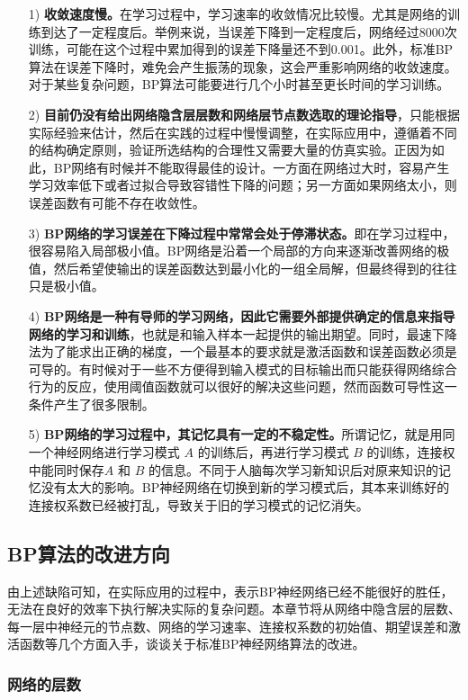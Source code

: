 \documentclass[UTF8]{ctexart}
\begin{document}
\begin{itemize}
\item [1)]
\textbf{收敛速度慢。}在学习过程中，学习速率的收敛情况比较慢。尤其是网络的训练到达了一定程度后。举例来说，当误差下降到一定程度后，网络经过8000次训练，可能在这个过程中累加得到的误差下降量还不到0.001。此外，标准BP算法在误差下降时，难免会产生振荡的现象，这会严重影响网络的收敛速度。对于某些复杂问题，BP算法可能要进行几个小时甚至更长时间的学习训练。
\item [2)]
\textbf{目前仍没有给出网络隐含层层数和网络层节点数选取的理论指导}，只能根据实际经验来估计，然后在实践的过程中慢慢调整，在实际应用中，遵循着不同的结构确定原则，验证所选结构的合理性又需要大量的仿真实验。正因为如此，BP网络有时候并不能取得最佳的设计。一方面在网络过大时，容易产生学习效率低下或者过拟合导致容错性下降的问题；另一方面如果网络太小，则误差函数有可能不存在收敛性。
\item [3)]
\textbf{BP网络的学习误差在下降过程中常常会处于停滞状态。}即在学习过程中，很容易陷入局部极小值。BP网络是沿着一个局部的方向来逐渐改善网络的极值，然后希望使输出的误差函数达到最小化的一组全局解，但最终得到的往往只是极小值。
\item [4)]
\textbf{BP网络是一种有导师的学习网络，因此它需要外部提供确定的信息来指导网络的学习和训练}，也就是和输入样本一起提供的输出期望。同时，最速下降法为了能求出正确的梯度，一个最基本的要求就是激活函数和误差函数必须是可导的。有时候对于一些不方便得到输入模式的目标输出而只能获得网络综合行为的反应，使用阈值函数就可以很好的解决这些问题，然而函数可导性这一条件产生了很多限制。
\item [5)]
\textbf{BP网络的学习过程中，其记忆具有一定的不稳定性。}所谓记忆，就是用同一个神经网络进行学习模式 $A$ 的训练后，再进行学习模式 $B$ 的训练，连接权中能同时保存$A$ 和 $B$ 的信息。不同于人脑每次学习新知识后对原来知识的记忆没有太大的影响。BP神经网络在切换到新的学习模式后，其本来训练好的连接权系数已经被打乱，导致关于旧的学习模式的记忆消失。
\end{itemize}

\subsection{BP算法的改进方向}

由上述缺陷可知，在实际应用的过程中，表示BP神经网络已经不能很好的胜任，无法在良好的效率下执行解决实际的复杂问题。本章节将从网络中隐含层的层数、每一层中神经元的节点数、网络的学习速率、连接权系数的初始值、期望误差和激活函数等几个方面入手，谈谈关于标准BP神经网络算法的改进。

\subsubsection{网络的层数}
\end{document}
